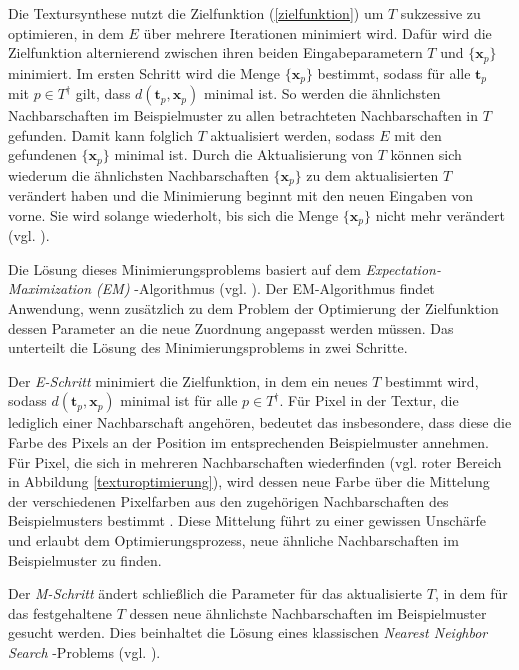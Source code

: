 Die Textursynthese nutzt die Zielfunktion (\ref{zielfunktion}) um $T$ sukzessive zu optimieren, in dem $E$ über mehrere Iterationen minimiert wird.
Dafür wird die Zielfunktion alternierend zwischen ihren beiden Eingabeparametern $T$ und $\lbrace \textbf{x}_p \rbrace$ minimiert.
Im ersten Schritt wird die Menge $\lbrace \textbf{x}_p \rbrace$ bestimmt, sodass für alle $\textbf{t}_p$ mit $p \in T^{\dagger}$ gilt, dass $d(\textbf{t}_p, \textbf{x}_p)$ minimal ist.
So werden die ähnlichsten Nachbarschaften im Beispielmuster zu allen betrachteten Nachbarschaften in $T$ gefunden.
Damit kann folglich $T$ aktualisiert werden, sodass $E$ mit den gefundenen $\lbrace \textbf{x}_p \rbrace$ minimal ist.
Durch die Aktualisierung von $T$ können sich wiederum die ähnlichsten Nachbarschaften $\lbrace \textbf{x}_p \rbrace$ zu dem aktualisierten $T$ verändert haben und die Minimierung beginnt mit den neuen Eingaben von vorne.
Sie wird solange wiederholt, bis sich die Menge $\lbrace \textbf{x}_p \rbrace$ nicht mehr verändert (vgl. \cite{TextureOptimization}).

Die Lösung dieses Minimierungsproblems basiert auf dem \emph{\glqq Expectation-Ma\-xi\-mi\-za\-tion (EM)\grqq} -Algorithmus (vgl. \cite{EM}).
Der EM-Algorithmus findet Anwendung, wenn zusätzlich zu dem Problem der Optimierung der Zielfunktion dessen Parameter an die neue Zuordnung angepasst werden müssen.
Das unterteilt die Lösung des Minimierungsproblems in zwei Schritte.

Der \emph{E-Schritt} minimiert die Zielfunktion, in dem ein neues $T$ bestimmt wird, sodass $d(\textbf{t}_p, \textbf{x}_p)$ minimal ist für alle $p \in T^{\dagger}$.
Für Pixel in der Textur, die lediglich einer Nachbarschaft angehören, bedeutet das insbesondere, dass diese die Farbe des Pixels an der Position im entsprechenden Beispielmuster annehmen.
Für Pixel, die sich in mehreren Nachbarschaften wiederfinden (vgl. roter Bereich in Abbildung \ref{texturoptimierung}), wird dessen neue Farbe über die Mittelung der verschiedenen Pixelfarben aus den zugehörigen Nachbarschaften des Beispielmusters bestimmt \cite{TextureOptimization}.
Diese Mittelung führt zu einer gewissen Unschärfe und erlaubt dem Optimierungsprozess, neue ähnliche Nachbarschaften im Beispielmuster zu finden.

Der \emph{M-Schritt} ändert schließlich die Parameter für das aktualisierte $T$, in dem für das festgehaltene $T$ dessen neue ähnlichste Nachbarschaften im Beispielmuster gesucht werden.
Dies beinhaltet die Lösung eines klassischen \emph{\glqq Nearest Neighbor Search\grqq} -Problems (vgl. \cite{TextureOptimization}).

